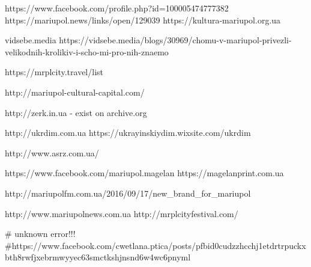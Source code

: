  
 
 
 
 

https://www.facebook.com/profile.php?id=100005474777382
https://mariupol.news/links/open/129039
https://kultura-mariupol.org.ua

vidsebe.media
https://vidsebe.media/blogs/30969/chomu-v-mariupol-privezli-velikodnih-krolikiv-i-scho-mi-pro-nih-znaemo

https://mrplcity.travel/list

http://mariupol-cultural-capital.com/

http://zerk.in.ua - exist on archive.org

http://ukrdim.com.ua
https://ukrayinskiydim.wixsite.com/ukrdim

http://www.asrz.com.ua/

https://www.facebook.com/mariupol.magelan
https://magelanprint.com.ua

http://mariupolfm.com.ua/2016/09/17/new_brand_for_mariupol

http://www.mariupolnews.com.ua
http://mrplcityfestival.com/


# unknown error!!!
#https://www.facebook.com/cwetlana.ptica/posts/pfbid0cudzzhcchj1etdrtrpuckxbth8rwfjxebrmwyyec63smctkshjnsnd6w4wc6pnyml
